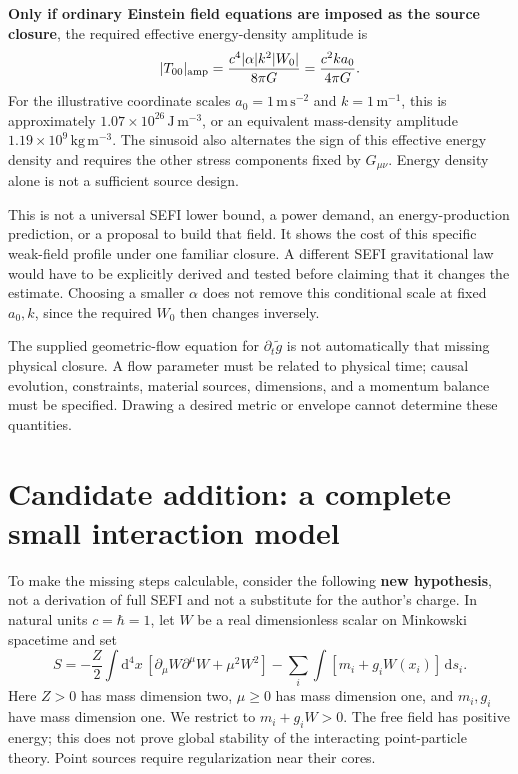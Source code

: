 \documentclass[11pt]{article}
\newcommand{\dd}{\mathrm{d}}
\begin{document}
\textbf{Only if ordinary Einstein field equations are imposed as the source closure}, the required effective energy-density amplitude is
\begin{equation}
 |T_{00}|_{\rm amp}=\frac{c^4|\alpha|k^2|W_0|}{8\pi G}
                  =\frac{c^2 k a_0}{4\pi G}.
\end{equation}
For the illustrative coordinate scales $a_0=1\,\mathrm{m\,s^{-2}}$ and $k=1\,\mathrm{m^{-1}}$, this is approximately $1.07\times10^{26}\,\mathrm{J\,m^{-3}}$, or an equivalent mass-density amplitude $1.19\times10^9\,\mathrm{kg\,m^{-3}}$. The sinusoid also alternates the sign of this effective energy density and requires the other stress components fixed by $G_{\mu\nu}$. Energy density alone is not a sufficient source design.

This is not a universal SEFI lower bound, a power demand, an energy-production prediction, or a proposal to build that field. It shows the cost of this specific weak-field profile under one familiar closure. A different SEFI gravitational law would have to be explicitly derived and tested before claiming that it changes the estimate. Choosing a smaller $\alpha$ does not remove this conditional scale at fixed $a_0,k$, since the required $W_0$ then changes inversely.

The supplied geometric-flow equation for $\partial_t\widetilde g$ is not automatically that missing physical closure. A flow parameter must be related to physical time; causal evolution, constraints, material sources, dimensions, and a momentum balance must be specified. Drawing a desired metric or envelope cannot determine these quantities.
\newpage
\section{Candidate addition: a complete small interaction model}
To make the missing steps calculable, consider the following \textbf{new hypothesis}, not a derivation of full SEFI and not a substitute for the author's charge. In natural units $c=\hbar=1$, let $W$ be a real dimensionless scalar on Minkowski spacetime and set
\begin{equation}
 S=-\frac Z2\int\dd^4x\,[\partial_\mu W\partial^\mu W+\mu^2 W^2]
       -\sum_i\int [m_i+g_iW(x_i)]\,\dd s_i .
 \label{action}
\end{equation}
Here $Z>0$ has mass dimension two, $\mu\geq0$ has mass dimension one, and $m_i,g_i$ have mass dimension one. We restrict to $m_i+g_iW>0$. The free field has positive energy; this does not prove global stability of the interacting point-particle theory. Point sources require regularization near their cores.
\end{document}

